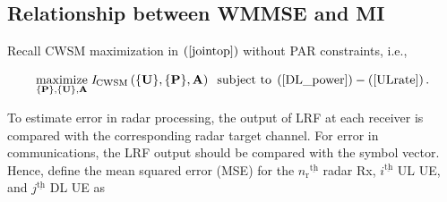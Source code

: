 \documentclass[10pt,journal]{IEEEtran}
\newcommand{\paren}[1]{\left({#1}\right)}
\newcommand{\braces}[1]{{\left\{ {#1}\right\}}}
\newcommand{\ith}[1]    {{#1}^{\underline{\text{th}}}}
\newcommand{\rr}{_\mathrm{r}}
\newcommand{\B}{\textrm{B}}
\theoremstyle{definition}
\begin{document}
\subsection{Relationship between WMMSE and MI}
\label{subsec: MMSE section}
Recall CWSM maximization in $\paren{\mathrm{\ref{jointop}}}$ without PAR constraints, i.e.,
\par\noindent\small
\begin{equation}\label{jointop_first}
\underset{{\braces{\mathbf{P}},\braces{\mathbf{U}},
\mathbf{A}}}{\text{maximize}}\; \mathit{I}_{\textrm{CWSM}}\paren{\braces{\mathbf{U}},\braces{\mathbf{P}},\mathbf{A}}\;\;\text{subject to}\; \paren{\mathrm{\ref{DL_power}}}-\paren{\mathrm{\ref{ULrate}}}.  
\end{equation}\normalsize

To estimate error in radar processing, the output of LRF at each receiver is compared with the corresponding radar target channel. For error in communications, the LRF output should be compared with the symbol vector. Hence, define the mean squared error (MSE) for the $\ith{n\rr}$ radar Rx, $\ith{i}$ UL UE, and $\ith{j}$ DL UE as \par\noindent\small
\iffalse
\end{document}
